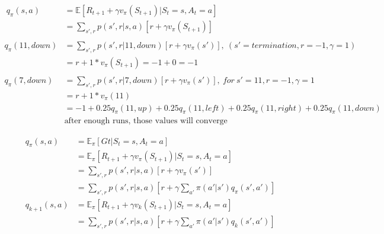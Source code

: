 \documentclass{article}
\begin{document}

\[
  \begin{aligned}
    \ q_{\pi}(s,a) &= \mathbb{E}[R_{t+1} + \gamma v_{\pi}(S_{t+1}) | S_{t}=s, A_{t}=a]\\
    &= \sum_{s',r}p(s',r|s,a)[r + \gamma v_{\pi}(S_{t+1})]\\
    \\
    q_{\pi}(11,down) &= \sum_{s',r}p(s',r|11,down)[r + \gamma v_{\pi}(s')], \ (s'=termination, r=-1, \gamma = 1) \\
    &= r + 1*v_{\pi}(S_{t+1}) = -1 + 0 = -1 \\
    \\
    q_{\pi}(7,down) &= \sum_{s',r}p(s',r|7,down)[r + \gamma v_{\pi}(s')], \  for \  s'=11, r=-1, \gamma = 1\\
    &= r + 1*v_{\pi}(11) \\
    &= -1 + 0.25q_{\pi}(11,up) + 0.25q_{\pi}(11,left) + 0.25q_{\pi}(11,right) + 0.25q_{\pi}(11,down)\\
    &\text{after enough runs, those values will converge}
  \end{aligned}
\]

\[
  \begin{aligned}
    q_{\pi}(s,a) &= \mathbb{E}_{\pi}[ Gt | S_{t}=s, A_{t}=a]\\
    &= \mathbb{E}_{\pi}[R_{t+1} + \gamma v_{\pi}(S_{t+1}) | S_{t}=s, A_{t}=a]\\
    &= \sum_{s',r}p(s',r|s,a)[r + \gamma v_{\pi}(s')]\\
    &= \sum_{s',r}p(s',r|s,a)[r + \gamma \sum_{a'}\pi(a'|s')q_{\pi}(s',a')]\\
    q_{k+1}(s, a) &= \mathbb{E}_{\pi}[R_{t+1} + \gamma v_{k}(S_{t+1}) | S_{t}=s, A_{t}=a]\\
    &= \sum_{s',r}p(s',r|s,a)[r + \gamma \sum_{a'}\pi(a'|s')q_{k}(s',a')]
  \end{aligned}
\]
\end{document}
